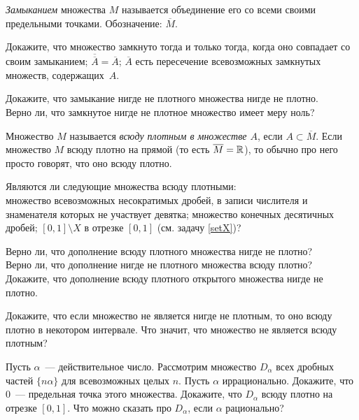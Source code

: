 \documentclass[a4paper, 11pt]{article}
\begin{document}
\emph{Замыканием} множества $M$ называется объединение его со всеми
своими предельными точками. Обозначение: $\overline{M}$.

Докажите, что
множество замкнуто тогда и только тогда, когда оно
совпадает со своим замыканием;
$\overline{\overline{A}}=\overline{A}$;
$\overline{A}$ есть пересечение всевозможных замкнутых множеств, содержащих~$A$.


\vfill
{}
\newpage



Докажите, что замыкание нигде не плотного множества нигде не плотно.\\
Верно ли, что замкнутое нигде не плотное множество имеет меру ноль?


Множество $M$ называется \emph{всюду плотным в множестве $A$},
если $A\subset\overline{M}$. Если множество $M$ всюду плотно
на прямой (то есть $\overline{M}=\mathbb{R}$), то обычно про него просто
говорят, что оно всюду плотно.

Являются ли следующие множества всюду плотными:\\
множество всевозможных несократимых дробей, в записи числителя
и знаменателя которых не участвует девятка;
множество конечных десятичных дробей;
$[0,1]\setminus X$ в отрезке $[0,1]$ (см. задачу \ref{setX})?

Верно ли, что дополнение всюду плотного множества нигде не плотно?\\
Верно ли, что дополнение нигде не плотного множества всюду плотно?\\
Докажите, что дополнение всюду плотного открытого множества
нигде не плотно.

Докажите, что если множество не является нигде не плотным,
то оно всюду плотно в некотором интервале.
Что значит, что множество не является всюду плотным?

Пусть $\alpha$~--- действительное число. Рассмотрим множество $D_\alpha$
всех дробных частей $\{n\alpha\}$ для всевозможных целых $n$.
Пусть $\alpha$ иррационально.
Докажите, что 0~--- предельная точка этого множества.
Докажите, что $D_\alpha$ всюду плотно на отрезке $[0,1]$.
Что можно сказать про $D_\alpha$, если $\alpha$ рационально?
\end{document}
